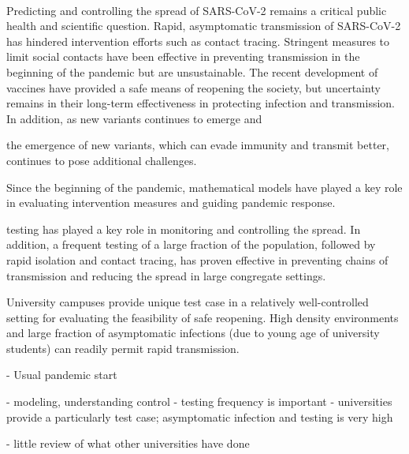 \documentclass[12pt]{article}
\date{\today}
\begin{document}
\begin{flushleft}{
	\Large
	\textbf{}
}
\newline
\\ 

\end{flushleft} 

\pagebreak

Predicting and controlling the spread of SARS-CoV-2 remains a critical public health and scientific question.
Rapid, asymptomatic transmission of SARS-CoV-2 has hindered intervention efforts such as contact tracing.
Stringent measures to limit social contacts have been effective in preventing transmission in the beginning of the pandemic but are unsustainable.
The recent development of vaccines have provided a safe means of reopening the society, but uncertainty remains in their long-term effectiveness in protecting infection and transmission.
In addition, as new variants continues to emerge and 

the emergence of new variants, which can evade immunity and transmit better, continues to pose additional challenges.


Since the beginning of the pandemic, mathematical models have played a key role in evaluating intervention measures and guiding pandemic response.



testing has played a key role in monitoring and controlling the spread.
In addition, a frequent testing of a large fraction of the population, followed by rapid isolation and contact tracing, has proven effective in preventing chains of transmission and reducing the spread in large congregate settings.

University campuses provide unique test case in a relatively well-controlled setting for evaluating the feasibility of safe reopening.
High density environments and large fraction of asymptomatic infections (due to young age of university students) can readily permit rapid transmission.




- Usual pandemic start

- modeling, understanding control
- testing frequency is important
- universities provide a particularly test case; asymptomatic infection and testing is very high

- little review of what other universities have done
\end{document}
